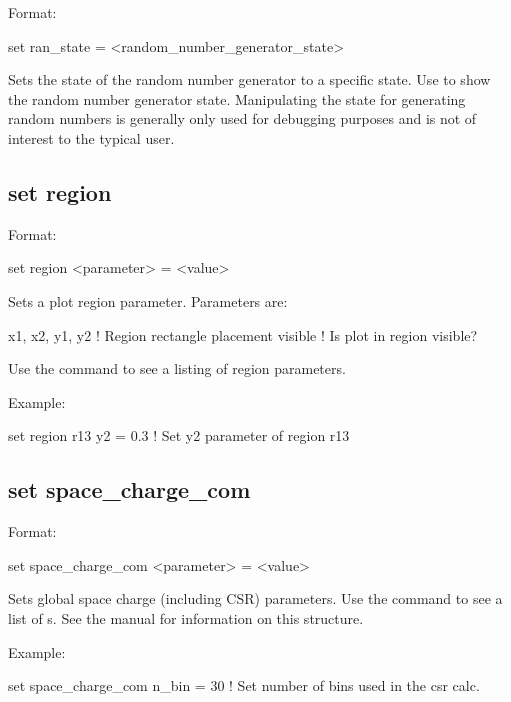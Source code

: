 {{{{{{Format:
\begin{example}
  set ran_state = <random_number_generator_state>
\end{example}

Sets the state of the random number generator to a specific state. Use 
to show the random number generator state. Manipulating the state for generating random numbers is
generally only used for debugging purposes and is not of interest to the typical user.


\subsection{set region}
\label{s:set.region}

Format:
\begin{example}
  set region <parameter> = <value>
\end{example}

Sets a plot region parameter. Parameters are:
\begin{example}
  x1, x2, y1, y2    ! Region rectangle placement
  visible           ! Is plot in region visible?
\end{example}

Use the  command to see a listing of region parameters.

Example:
\begin{example}
  set region r13 y2 = 0.3  ! Set y2 parameter of region r13
\end{example}


\subsection{set space_charge_com}
\label{s:set.sc.com}

Format:
\begin{example}
  set space_charge_com <parameter> = <value>
\end{example}

Sets global space charge (including CSR) parameters. Use the 
command to see a list of s. See the \bmad manual for information on this structure.

Example:
\begin{example}
  set space_charge_com n_bin = 30  ! Set number of bins used in the csr calc.
\end{example}

}}}}}}
